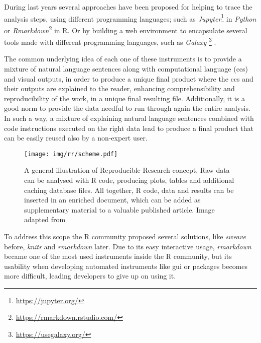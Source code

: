 During last years several approaches \cite{russo2015advantages} have been proposed for helping to trace the analysis steps, using different programming languages; such as  \textit{Jupyter}\footnote{\url{https://jupyter.org/}} \cite{Kluyver2016} in \textit{Python} or \textit{Rmarkdown}\footnote{\url{https://rmarkdown.rstudio.com/}} in R.
Or by building a web environment to encapsulate several tools made with different programming languages, such as \textit{Galaxy} \footnote{\url{https://usegalaxy.org/}} \cite{Blankenberg2010, Giardine2005, Goecks2010}.

The common underlying idea of each one of these instruments is to provide a mixture of natural language sentences along with computational language (\glspl{cc}) and visual outputs, in order to produce a unique final product where the \glspl{cc} and their outputs are explained to the reader, enhancing comprehensibility and reproducibility of the work, in a unique final resulting file.
Additionally, it is a good norm to provide the data needful to run through again the entire analysis.
In such a way, a mixture of explaining natural language sentences combined with code instructions executed on the right data lead to produce a final product that can be easily reused also by a non-expert user.

\begin{figure}[H]
\centering
\texttt{[image: img/rr/scheme.pdf]}
\caption[Reproducible Research illustration]{A general illustration of Reproducible Research concept. Raw data can be analysed with R code, producing plots, tables and additional caching database files. All together, R code, data and results can be inserted in an enriched document, which can be added as supplementary material to a valuable published article.\newline
Image adapted from \cite{RussoRighelli2016}}
\label{fig:rrscheme}
\end{figure}

To address this scope the R community proposed several solutions, like \textit{sweave} before, \textit{knitr} and \textit{rmarkdown} later.
Due to its easy interactive usage, \textit{rmarkdown} became one of the most used instruments inside the R community, but its usability when developing automated instruments like \gls{gui} or packages becomes more difficult, leading developers to give up on using it.

